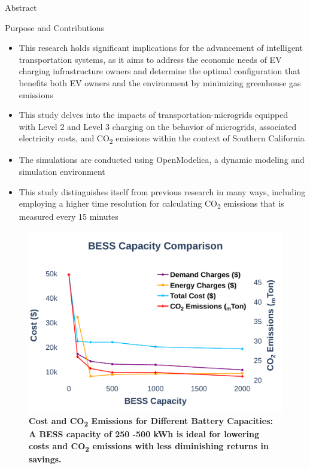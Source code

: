 \documentclass[final, 36 pt]{beamer}
\newlength{\onecolwid}
\begin{document}
\begin{frame}[t]
\begin{columns}[t]
\begin{column}{\onecolwid}
\begin{alertblock}{Abstract}
\end{alertblock}
\begin{alertblock}{Purpose and Contributions}
	\begin{itemize}
		\item This research holds significant implications for the advancement of intelligent transportation systems, as it aims to address the economic needs of EV charging infrastructure owners and determine the optimal configuration that benefits both EV owners and the environment by minimizing greenhouse gas emissions
		\item This study delves into the impacts of transportation-microgrids equipped with Level 2 and Level 3 charging on the behavior of microgrids, associated electricity costs, and CO\textsubscript{2} emissions within the context of Southern California
		\item The simulations are conducted using OpenModelica, a dynamic modeling and simulation environment
		\item This study distinguishes itself from previous research in many ways, including employing a higher time resolution for calculating CO\textsubscript{2} emissions that is measured every 15 minutes
	\end{itemize}
\end{alertblock}

\begin{block}{}
		\begin{figure}[!htb] 		
		\includegraphics[width=\linewidth]{Fig/bess_capacity_comparison_large_font}
		\caption{\large \bf{Cost and CO\textsubscript{2} Emissions for Different Battery Capacities: A BESS capacity of 250 -500 kWh is ideal for lowering costs and CO\textsubscript{2} emissions with less diminishing returns in savings.}}
		\label{fig:besscapacitycomparison}		
	\end{figure}
\end{block}


\end{column}
\end{columns}
\end{frame}
\end{document}
